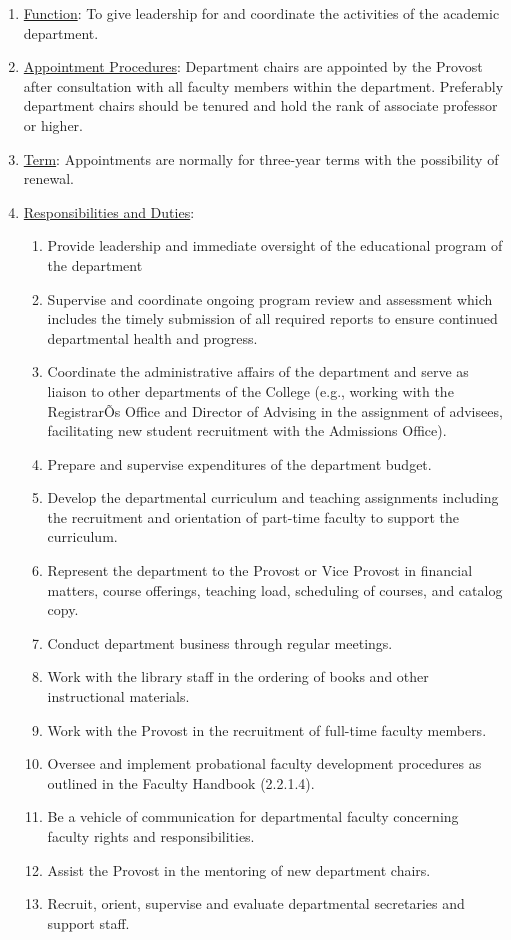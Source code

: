 \documentclass[letterpaper, 11pt]{article}
\newcounter{subsubparagraph}
\begin{document}
					\begin{enumerate}[label=\alph*)]
						\item{\underline{Function}:  To give leadership for and coordinate the activities of the academic department.}
						\item{\underline{Appointment Procedures}:  Department chairs are appointed by the Provost after consultation with all faculty members within the department.  Preferably department chairs should be tenured and hold the rank of associate professor or higher.}
						\item{\underline{Term}:  Appointments are normally for three-year terms with the possibility of renewal.}
						\item{\underline{Responsibilities and Duties}:
							\begin{enumerate}[label=\arabic*)]
								\item{Provide leadership and immediate oversight of the educational program of the department}
								\item{Supervise and coordinate ongoing program review and assessment which includes the timely submission of all required reports to ensure continued departmental health and progress.}
								\item{Coordinate the administrative affairs of the department and serve as liaison to other departments of the College (e.g., working with the RegistrarÕs Office and Director of Advising in the assignment of advisees, facilitating new student recruitment with the Admissions Office).}
								\item{Prepare and supervise expenditures of the department budget.}
								\item{Develop the departmental curriculum and teaching assignments including the recruitment and orientation of part-time faculty to support the curriculum.}
								\item{Represent the department to the Provost or Vice Provost in financial matters, course offerings, teaching load, scheduling of courses, and catalog copy.}
								\item{Conduct department business through regular meetings.}
								\item{Work with the library staff in the ordering of books and other instructional materials.}
								\item{Work with the Provost in the recruitment of full-time faculty members.}
								\item{Oversee and implement probational faculty development procedures as outlined in the Faculty Handbook (2.2.1.4).}
								\item{Be a vehicle of communication for departmental faculty concerning faculty rights and responsibilities.}
								\item{Assist the Provost in the mentoring of new department chairs.}
								\item{Recruit, orient, supervise and evaluate departmental secretaries and support staff.}
							\end{enumerate}
						}
					\end{enumerate}
\end{document}
